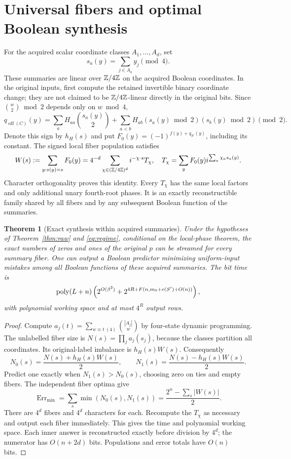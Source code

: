 \documentclass[11pt,a4paper]{article}
\newtheorem{theorem}{Theorem}[section]
\newcommand{\off}{\operatorname{off}}\newcommand{\diag}{\operatorname{diag}}
\begin{document}
\section{Universal fibers and optimal Boolean synthesis}
\label{sec:synthesis}
For the acquired scalar coordinate classes $A_1,\ldots,A_d$, set
\[
s_a(y)=\sum_{j\in A_a}y_j\pmod4.
\]
These summaries are linear over $\mathbb Z/4\mathbb Z$ on the acquired Boolean
coordinates. In the original inputs, first compute the retained
invertible binary coordinate change; they are not claimed to be
$\mathbb Z/4\mathbb Z$-linear directly in the original bits.
Since $\binom w2\bmod2$ depends only on $w\bmod4$,
\begin{equation}\label{eq:summaryquad}
q_{\off(C)}(y)=\sum_aH_{aa}\binom{s_a(y)}2+
\sum_{a<b}H_{ab}(s_a(y)\bmod2)(s_b(y)\bmod2)\pmod2.
\end{equation}
Denote this sign by $h_H(s)$ and put
$F_0(y)=(-1)^{f(y)+q_{S'}(y)}$, including its constant.
The signed local fiber population satisfies
\begin{equation}\label{eq:fiber}
W(s):=\sum_{y:s(y)=s}F_0(y)
=4^{-d}\sum_{\chi\in(\mathbb Z/4\mathbb Z)^d}i^{-\chi\cdot s}T_\chi,
\quad
T_\chi=\sum_yF_0(y)i^{\sum_a\chi_a s_a(y)}.
\end{equation}
Character orthogonality proves this identity. Every $T_\chi$
has the same local factors and only additional unary fourth-root
phases. It is an exactly reconstructible family shared by all
fibers and by any subsequent Boolean function of the summaries.

\begin{theorem}[Exact synthesis within acquired summaries]\label{thm:synth}
Under the hypotheses of Theorem~\ref{thm:raw} and
\eqref{eq:regime}, conditional on the local-phase theorem,
the exact numbers of zeros and ones of the original $p$ can be
streamed for every summary fiber. One can output a Boolean
predictor minimizing uniform-input mistakes among \emph{all
Boolean functions of these acquired summaries}. The bit time is
\[
\operatorname{poly}(L+n)\left(2^{O(\beta^2)}
+2^{4R+F(n,m_0+e(S')+O(n))}\right),
\]
with polynomial working space and at most $4^R$ output rows.
\end{theorem}
\begin{proof}
Compute $a_j(t)=\sum_{w\equiv t\ (4)}\binom{|A_j|}{w}$ by
four-state dynamic programming. The unlabelled fiber size is
$N(s)=\prod_j a_j(s_j)$, because the classes partition all
coordinates. Its original-label imbalance is $h_H(s)W(s)$.
Consequently
\[
N_0(s)=\frac{N(s)+h_H(s)W(s)}2,\qquad
N_1(s)=\frac{N(s)-h_H(s)W(s)}2.
\]
Predict one exactly when $N_1(s)>N_0(s)$, choosing zero on
ties and empty fibers. The independent fiber optima give
\begin{equation}\label{eq:risk}
\operatorname{Err}_{\min}
=\sum_s\min(N_0(s),N_1(s))
=\frac{2^n-\sum_s|W(s)|}{2}.
\end{equation}
There are $4^d$ fibers and $4^d$ characters for each. Recompute
the $T_\chi$ as necessary and output each fiber immediately.
This gives the time and polynomial working space. Each inner
answer is reconstructed exactly before division by $4^d$;
the numerator has $O(n+2d)$ bits. Populations and error totals
have $O(n)$ bits.
\end{proof}
\end{document}
